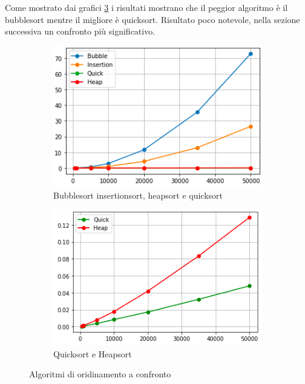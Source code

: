 \documentclass[12pt,a4paper]{report}
\begin{document}
Come mostrato dai grafici \ref{Fig:AllSort} i risultati mostrano che il peggior algoritmo è il bubblesort mentre il migliore è quicksort.  Risultato poco notevole, nella sezione successiva un confronto più significativo.

\begin{figure}[ht]
     \centering
     \begin{subfigure}[t]{0.45\textwidth}
         \centering
         \includegraphics[width=\textwidth]{Img/GraficiSorting/AllSorting.png}
         \caption{Bubblesort insertionsort, heapsort e quicksort}
         \label{Fig:AllSortingAlg}
     \end{subfigure}
     \hfill
     \begin{subfigure}[t]{0.45\textwidth}
         \centering
         \includegraphics[width=\textwidth]{Img/GraficiSorting/QHSorting.png}
         \caption{Quicksort e Heapsort}
         \label{Fig:QHSort}
     \end{subfigure}

   \caption{Algoritmi di oridinamento a confronto}
   \label{Fig:AllSort}
\end{figure}
\end{document}
